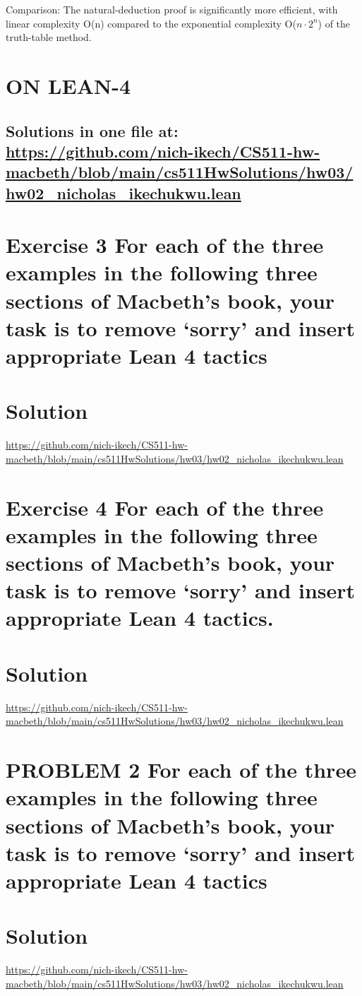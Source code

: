\documentclass{article}
\begin{document}
Comparison: The natural-deduction proof is significantly more efficient, with linear complexity O(n) compared to the exponential complexity O($n \cdot 2^n$) of the truth-table method.



\newpage
\section*{ON LEAN-4}
\subsection*{Solutions in one file at: 
\url{https://github.com/nich-ikech/CS511-hw-macbeth/blob/main/cs511HwSolutions/hw03/hw02_nicholas_ikechukwu.lean}}

\newpage

\section*{Exercise 3 For each of the three examples in the following three sections of Macbeth’s book, your
task is to remove ‘sorry’ and insert appropriate Lean 4 tactics}
\section*{Solution}
\url{https://github.com/nich-ikech/CS511-hw-macbeth/blob/main/cs511HwSolutions/hw03/hw02_nicholas_ikechukwu.lean}

\newpage

\section*{Exercise 4 For each of the three examples in the following three sections of Macbeth’s book, your
task is to remove ‘sorry’ and insert appropriate Lean 4 tactics.}
\section*{Solution}

\url{https://github.com/nich-ikech/CS511-hw-macbeth/blob/main/cs511HwSolutions/hw03/hw02_nicholas_ikechukwu.lean}

\newpage

\section*{PROBLEM 2 For each of the three examples in the following three sections of Macbeth’s book,
your task is to remove ‘sorry’ and insert appropriate Lean 4 tactics}
\section*{Solution}

\url{https://github.com/nich-ikech/CS511-hw-macbeth/blob/main/cs511HwSolutions/hw03/hw02_nicholas_ikechukwu.lean}
\end{document}
